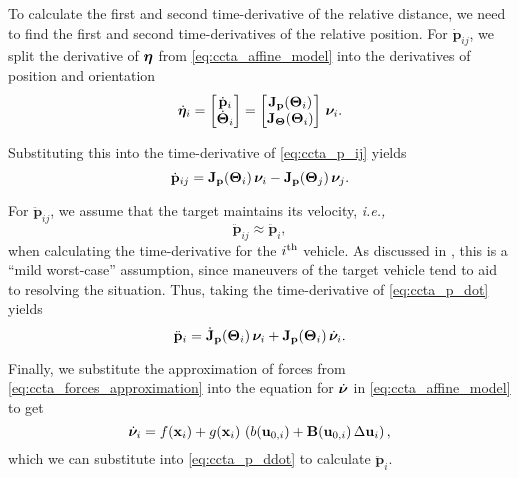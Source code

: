 To calculate the first and second time-derivative of the relative distance, we need to find the first and second time-derivatives of the relative position.
For $\dot{\mathbf{p}}_{ij}$, we split the derivative of $\bm{\eta}$ from \eqref{eq:ccta_affine_model} into the derivatives of position and orientation \vspace{-2mm}
\begin{equation}
    \dot{\bm{\eta}}_{i} = \begin{bmatrix} \dot{\mathbf{p}}_{i} \\ \dot{\bm{\Theta}}_{i} \end{bmatrix} = \begin{bmatrix}
        \mathbf{J}_{\mathbf{p}}(\bm{\Theta}_{i}) \\ \mathbf{J}_{\bm{\Theta}}(\bm{\Theta}_{i})
    \end{bmatrix}\,\bm{\nu}_{i}.
\end{equation}

\noindent Substituting this into the time-derivative of \eqref{eq:ccta_p_ij} yields
\begin{equation}
    \dot{\mathbf{p}}_{ij} = \mathbf{J}_{\mathbf{p}}(\bm{\Theta}_{i}) \, \bm{\nu}_{i} - \mathbf{J}_{\mathbf{p}}(\bm{\Theta}_{j}) \, \bm{\nu}_{j}.
    \label{eq:ccta_p_dot}
\end{equation}

\noindent For $\ddot{\mathbf{p}}_{ij}$, we assume that the target maintains its velocity, \emph{i.e.,}
\begin{equation}
    \ddot{\mathbf{p}}_{ij} \approx \ddot{\mathbf{p}}_{i},
\end{equation}
when calculating the time-derivative for the $i^{\rm th}$ vehicle.
As discussed in \cite{thyri_reactive_2020}, this is a ``mild worst-case'' assumption, since maneuvers of the target vehicle tend to aid to resolving the situation.
Thus, taking the time-derivative of \eqref{eq:ccta_p_dot} yields
\begin{equation}
    \ddot{\mathbf{p}}_{i} = \dot{\mathbf{J}}_{\mathbf{p}}(\bm{\Theta}_{i}) \, \bm{\nu}_{i} + \mathbf{J}_{\mathbf{p}}(\bm{\Theta}_{i}) \, \dot{\bm{\nu}}_{i}.
    \label{eq:ccta_p_ddot}
\end{equation}

Finally, we substitute the approximation of forces from \eqref{eq:ccta_forces_approximation} into the equation for $\dot{\bm{\nu}}$ in \eqref{eq:ccta_affine_model} to get
\begin{equation}
    \dot{\bm{\nu}}_{i} = f(\mathbf{x}_{i}) + g(\mathbf{x}_{i})\,\left(b(\mathbf{u}_{0,i}) + \mathbf{B}(\mathbf{u}_{0,i})\,\Delta\mathbf{u}_{i}\right),
\end{equation}
which we can substitute into \eqref{eq:ccta_p_ddot} to calculate $\ddot{\mathbf{p}}_{i}$.

